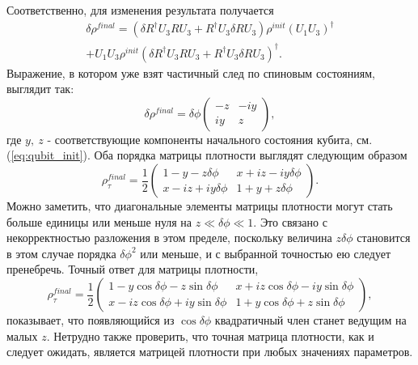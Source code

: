 \documentclass[a4paper,12pt]{article}
\theoremstyle{plain} %
\theoremstyle{definition} %
\theoremstyle{remark} %
\begin{document}
Соответственно, для изменения результата получается
\begin{multline}
    \delta \rho^{final} = \left( \delta R^\dagger U_3 R U_3 + R^\dagger U_3 \delta R U_3 \right) \rho^{init} (U_1 U_3)^\dagger \\
    + U_1 U_3 \rho^{init} \left( \delta R^\dagger U_3 R U_3 + R^\dagger U_3 \delta R U_3 \right)^\dagger.
\end{multline}
Выражение, в котором уже взят частичный след по спиновым состояниям, выглядит так:
\begin{equation}
    \delta \rho^{final} = \delta \phi
    \begin{pmatrix}
        -z & - i y \\
        i y & z
    \end{pmatrix},
\end{equation}
где $y,\ z$ - соответствующие компоненты начального состояния кубита, см. (\ref{eq:qubit_init}).
Оба порядка матрицы плотности выглядят следующим образом
\begin{equation}
    \rho^{final}_\tau = \frac{1}{2}
    \begin{pmatrix}
        1 - y -  z \delta \phi & x + i z -  i y \delta \phi \\
        x - i z + i y \delta \phi & 1 + y +  z \delta \phi
    \end{pmatrix}.
\end{equation}
Можно заметить, что диагональные элементы матрицы плотности могут стать больше единицы или меньше нуля на $z \ll \delta \phi \ll 1$. Это связано с некорректностью разложения в этом пределе, поскольку величина $z \delta \phi$ становится в этом случае порядка $\delta \phi^2$ или меньше, и с выбранной точностью ею следует пренебречь. Точный ответ для матрицы плотности,
\begin{equation}
    \rho^{final}_\tau = \frac{1}{2}
    \begin{pmatrix}
    1 - y \cos \delta \phi - z \sin \delta \phi & x + i z \cos \delta \phi - i y \sin \delta \phi \\
    x - i z \cos \delta \phi + i y \sin \delta \phi & 1 + y \cos \delta \phi + z \sin \delta \phi
    \end{pmatrix},
\end{equation}
показывает, что появляющийся из $\cos \delta \phi$ квадратичный член станет ведущим на малых $z$. Нетрудно также проверить, что точная матрица плотности, как и следует ожидать, является матрицей плотности при любых значениях параметров.


\pagebreak



\end{document}
